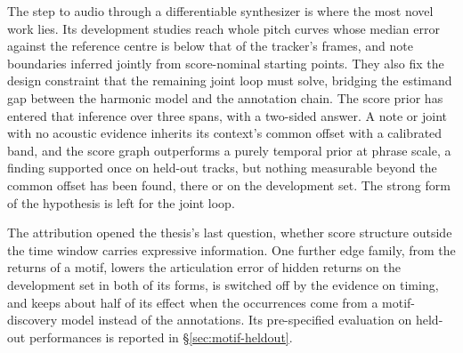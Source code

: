 The step to audio through a differentiable synthesizer is where the most
novel work lies. Its development studies reach whole pitch curves whose
median error against the reference centre is below that of the tracker's
frames, and note boundaries inferred jointly from score-nominal starting
points. They also fix the design constraint that the remaining joint loop
must solve, bridging the estimand gap between the harmonic model and the
annotation chain. The score prior has entered that inference over three
spans, with a two-sided answer. A note or joint with no acoustic evidence
inherits its context's common offset with a calibrated band, and the score
graph outperforms a purely temporal prior at phrase scale, a finding
supported once on held-out tracks, but nothing measurable beyond the
common offset has been found, there or on the development set. The strong form of the hypothesis is left for the joint loop.

The attribution opened the thesis's last question, whether score
structure outside the time window carries expressive information. One
further edge family, from the returns of a motif, lowers the articulation
error of hidden returns on the development set in both of its forms, is
switched off by the evidence on timing, and keeps about half of its effect
when the occurrences come from a motif-discovery model instead of the
annotations. Its pre-specified evaluation on held-out performances is
reported in \S\ref{sec:motif-heldout}.

